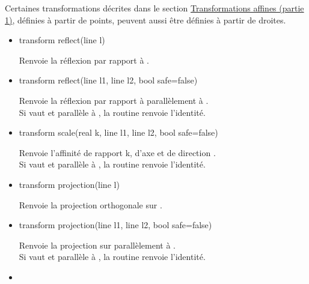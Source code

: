 \documentclass[pdftex]{article}
\begin{document}
Certaines transformations décrites dans le section \href{#section.transform1}{Transformations
  affines (partie 1)}, définies à partir de points, peuvent aussi
être définies à partir de droites.
\begin{itemize}
\item {}
  \begin{Vcolor}
    transform reflect(line l)
  \end{Vcolor}
  Renvoie la réflexion par rapport à .
\item {}
  \begin{Vcolor}
    transform reflect(line l1, line l2, bool safe=false)
  \end{Vcolor}
  Renvoie la réflexion par rapport à  parallèlement à .\\
  Si  vaut  et  parallèle
  à , la routine renvoie l'identité.
\item {}
  \begin{Vcolor}
    transform scale(real k, line l1, line l2, bool safe=false)
  \end{Vcolor}
  Renvoie l'affinité de rapport k, d'axe  et de direction .\\
  Si  vaut  et  parallèle
  à , la routine renvoie l'identité.
\item {}
  \begin{Vcolor}
    transform projection(line l)
  \end{Vcolor}
  Renvoie la projection orthogonale sur .
\item {}
  \begin{Vcolor}
    transform projection(line l1, line l2, bool safe=false)
  \end{Vcolor}
  Renvoie la projection sur  parallèlement à .\\
  Si  vaut  et  parallèle
  à , la routine renvoie l'identité.
\item {}

\end{itemize}
\end{document}
